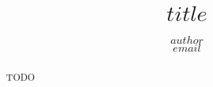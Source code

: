 \documentclass[11pt,a4paper]{article}
\begin{document}
\title{$title$}
\author{$author$ \\ \href{mailto:$email$}{$email$}}

\date{}
\maketitle

\begin{abstract}
    TODO
\end{abstract}


% 

\end{document}
